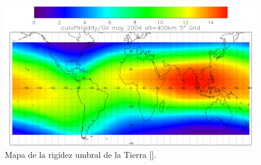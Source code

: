 \begin{frame}{}
\begin{columns}
            \begin{column}{0.6\textwidth} %
                \begin{figure}
                    \includegraphics[width=1.0\textwidth]{Figures/rigiditymap.png}
                    \caption{\tiny Mapa de la rigidez umbral de la Tierra [\cite{labrenz2014}].}
                \end{figure}
            \end{column}
        \end{columns}
    \end{frame}   

